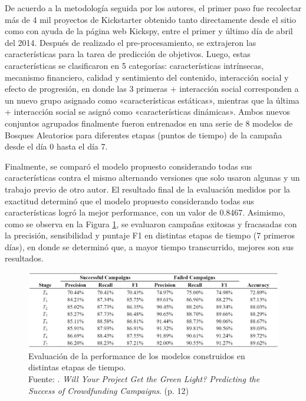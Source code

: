 De acuerdo a la metodología seguida por los autores, el primer paso fue recolectar más de 4 mil proyectos de Kickstarter obtenido tanto directamente desde el sitio como con ayuda de la página web Kickspy, entre el primer y último día de abril del 2014. Después de realizado el pre-procesamiento, se extrajeron las características para la tarea de predicción de objetivos. Luego, estas características se clasificaron en 5 categorías: características intrínsecas, mecanismo financiero, calidad y sentimiento del contenido, interacción social y efecto de progresión, en donde las 3 primeras + interacción social corresponden a un nuevo grupo asignado como «características estáticas», mientras que la última + interacción social se asignó como «características dinámicas». Ambos nuevos conjuntos agrupados finalmente fueron entrenados en una serie de 8 modelos de Bosques Aleatorios para diferentes etapas (puntos de tiempo) de la campaña desde el día 0 hasta el día 7.

Finalmente, se comparó el modelo propuesto considerando todas sus características contra el mismo alternando versiones que solo usaron algunas y un trabajo previo de otro autor. El resultado final de la evaluación medidos por la exactitud determinó que el modelo propuesto considerando todas sus características logró la mejor performance, con un valor de 0.8467. Asimismo, como se observa en la Figura \ref{2:fig114}, se evaluaron campañas exitosas y fracasadas con la precisión, sensibilidad y puntaje F1 en distintas etapas de tiempo (7 primeros días), en donde se determinó que, a mayor tiempo transcurrido, mejores son sus resultados.

\begin{figure}[!ht]
	\begin{center}
		\includegraphics[width=1\textwidth]{2/figures/chen2015.jpg}
		\caption[Evaluación de la performance de los modelos construidos en distintas etapas de tiempo]{Evaluación de la performance de los modelos construidos en distintas etapas de tiempo.\\
			Fuente: \cite{pr_chen2015predcrowd}. \textit{Will Your Project	Get the Green Light? Predicting the Success of Crowdfunding Campaigns}. (p. 12)}
		\label{2:fig114}
	\end{center}
\end{figure}

